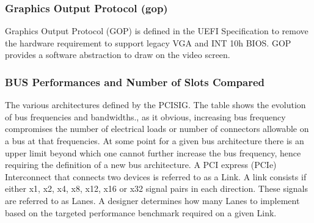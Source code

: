 \subsubsection{Graphics Output Protocol (\gls{gop})}
Graphics Output Protocol (GOP) is defined in the UEFI Specification to remove the hardware requirement to support legacy VGA and INT 10h BIOS. GOP provides a software abstraction to draw on the video screen.

\subsubsection{BUS Performances and Number of Slots Compared}
The various architectures defined by the PCISIG. The table shows the evolution of bus frequencies and bandwidths., as it obvious, increasing bus frequency compromises the number of electrical loads or number of connectors allowable on a bus at that frequencies. At some point for a given bus architecture there is an upper limit beyond which one cannot further increase the bus frequency, hence requiring the definition of a new bus architecture.
A PCI express (PCIe) Interconnect that connects two devices is referred to as a Link. A link consists if either x1, x2, x4, x8, x12, x16 or x32 signal pairs in each direction. These signals are referred to as Lanes. A designer determines how many Lanes to implement based on the targeted performance benchmark required on a given Link.

